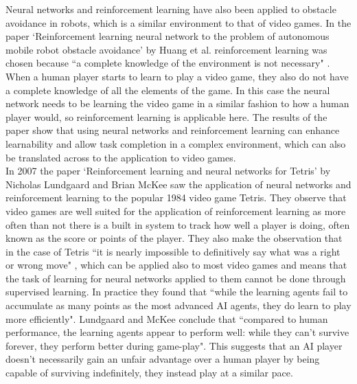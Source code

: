 \documentclass[10pt]{article}
\begin{document}
		Neural networks and reinforcement learning have also been applied to obstacle avoidance in robots, which is a similar environment to that of video games. In the paper `Reinforcement learning neural network to the problem of autonomous mobile robot obstacle avoidance' by Huang et al.  reinforcement learning was chosen because ``a complete knowledge of the environment is not necessary" \cite{rlrobot}. When a human player starts to learn to play a video game, they also do not have a complete knowledge of all the elements of the game. In this case the neural network needs to be learning the video game in a similar fashion to how a human player would, so reinforcement learning is applicable here. The results of the paper show that using neural networks and reinforcement learning can enhance learnability and allow task completion in a complex environment, which can also be translated across to the application to video games.\\

		In 2007 the paper `Reinforcement learning and neural networks for Tetris' by Nicholas Lundgaard and Brian McKee saw the application of neural networks and reinforcement learning to the popular 1984 video game Tetris. They observe that video games are well suited for the application of reinforcement learning as more often than not there is a built in system to track how well a player is doing, often known as the score or points of the player. They also make the observation that in the case of Tetris ``it is nearly impossible to definitively say what was a right or wrong move" \cite{rlnntetris}, which can be applied also to most video games and means that the task of learning for neural networks applied to them cannot be done through supervised learning. In practice they found that ``while the learning agents fail to accumulate as many points as the most advanced AI agents, they do learn to play more efficiently"\cite{rlnntetris}. Lundgaard and McKee conclude that ``compared to human performance, the learning agents appear to perform well: while they can't survive forever, they perform better during game-play"\cite{rlnntetris}. This suggests that an AI player doesn't necessarily gain an unfair advantage over a human player by being capable of surviving indefinitely, they instead play at a similar pace.\\
		
\end{document}
